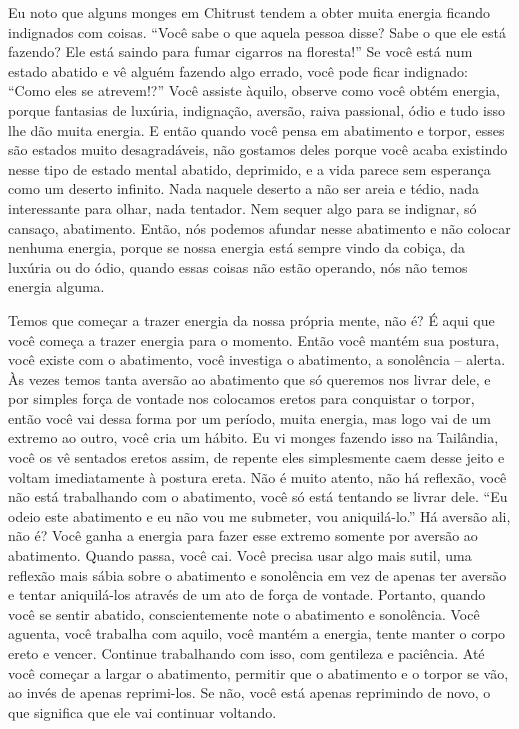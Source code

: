 Eu noto que alguns monges em Chitrust tendem a obter muita energia
ficando indignados com coisas. “Você sabe o que aquela pessoa disse?
Sabe o que ele está fazendo? Ele está saindo para fumar cigarros na
floresta!” Se você está num estado abatido e vê alguém fazendo algo
errado, você pode ficar indignado: “Como eles se atrevem!?” Você
assiste àquilo, observe como você obtém energia, porque fantasias de
luxúria, indignação, aversão, raiva passional, ódio e tudo isso lhe dão
muita energia. E então quando você pensa em abatimento e torpor, esses
são estados muito desagradáveis, não gostamos deles porque você acaba
existindo nesse tipo de estado mental abatido, deprimido, e a vida
parece sem esperança como um deserto infinito. Nada naquele deserto a
não ser areia e tédio, nada interessante para olhar, nada tentador. Nem
sequer algo para se indignar, só cansaço, abatimento. Então, nós
podemos afundar nesse abatimento e não colocar nenhuma energia, porque
se nossa energia está sempre vindo da cobiça, da luxúria ou do ódio,
quando essas coisas não estão operando, nós não temos energia alguma.

Temos que começar a trazer energia da nossa própria mente, não é? É
aqui que você começa a trazer energia para o momento. Então você mantém
sua postura, você existe com o abatimento, você investiga o abatimento,
a sonolência – alerta. Às vezes temos tanta aversão ao abatimento que
só queremos nos livrar dele, e por simples força de vontade nos
colocamos eretos para conquistar o torpor, então você vai dessa forma
por um período, muita energia, mas logo vai de um extremo ao outro,
você cria um hábito. Eu vi monges fazendo isso na Tailândia, você os vê
sentados eretos assim, de repente eles simplesmente caem desse jeito e
voltam imediatamente à postura ereta. Não é muito atento, não há
reflexão, você não está trabalhando com o abatimento, você só está
tentando se livrar dele. “Eu odeio este abatimento e eu não vou me
submeter, vou aniquilá-lo.” Há aversão ali, não é? Você ganha a energia
para fazer esse extremo somente por aversão ao abatimento. Quando
passa, você cai. Você precisa usar algo mais sutil, uma reflexão mais
sábia sobre o abatimento e sonolência em vez de apenas ter aversão e
tentar aniquilá-los através de um ato de força de vontade. Portanto,
quando você se sentir abatido, conscientemente note o abatimento e
sonolência. Você aguenta, você trabalha com aquilo, você mantém a
energia, tente manter o corpo ereto e vencer. Continue trabalhando com
isso, com gentileza e paciência. Até você começar a largar o
abatimento, permitir que o abatimento e o torpor se vão, ao invés de
apenas reprimi-los. Se não, você está apenas reprimindo de novo, o que
significa que ele vai continuar voltando.

